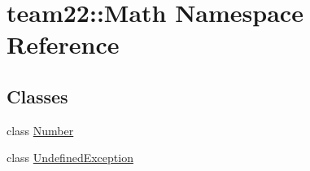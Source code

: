 \hypertarget{namespaceteam22_1_1_math}{}\section{team22\+:\+:Math Namespace Reference}
\label{namespaceteam22_1_1_math}
\subsection*{Classes}
\begin{DoxyCompactItemize}
\item 
class \hyperlink{classteam22_1_1_math_1_1_number}{Number}
\item 
class \hyperlink{classteam22_1_1_math_1_1_undefined_exception}{Undefined\+Exception}
\end{DoxyCompactItemize}
